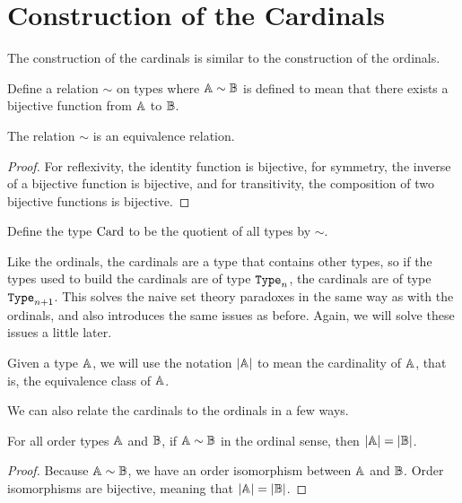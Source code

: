 \documentclass[../../math.tex]{subfiles}
\begin{document}
\section{Construction of the Cardinals} \label{card_base}

The construction of the cardinals is similar to the construction of the
ordinals.

\begin{definition}
    Define a relation $\sim$ on types where $\mathbb{A} \sim \mathbb{B}$ is defined to mean that
    there exists a bijective function from $\mathbb{A}$ to $\mathbb{B}$.
\end{definition}

\begin{lemma}
    The relation $\sim$ is an equivalence relation.
\end{lemma}
\begin{proof}
    For reflexivity, the identity function is bijective, for symmetry, the
    inverse of a bijective function is bijective, and for transitivity, the
    composition of two bijective functions is bijective.
\end{proof}

\begin{definition}
    Define the type $\operatorname{Card}$ to be the quotient of all types by $\sim$.
\end{definition}

Like the ordinals, the cardinals are a type that contains other types, so if the
types used to build the cardinals are of type $\Type_n$, the cardinals are of
type $\Type_{n+1}$.  This solves the naive set theory paradoxes in the same way
as with the ordinals, and also introduces the same issues as before.  Again, we
will solve these issues a little later.

\begin{definition}
    Given a type $\mathbb{A}$, we will use the notation $|\mathbb{A}|$ to mean the cardinality
    of $\mathbb{A}$, that is, the equivalence class of $\mathbb{A}$.
\end{definition}

We can also relate the cardinals to the ordinals in a few ways.

\begin{lemma}
    For all order types $\mathbb{A}$ and $\mathbb{B}$, if $\mathbb{A} \sim \mathbb{B}$ in the ordinal sense,
    then $|\mathbb{A}| = |\mathbb{B}|$.
\end{lemma}
\begin{proof}
    Because $\mathbb{A} \sim \mathbb{B}$, we have an order isomorphism between $\mathbb{A}$ and $\mathbb{B}$.
    Order isomorphisms are bijective, meaning that $|\mathbb{A}| = |\mathbb{B}|$.
\end{proof}
\end{document}
